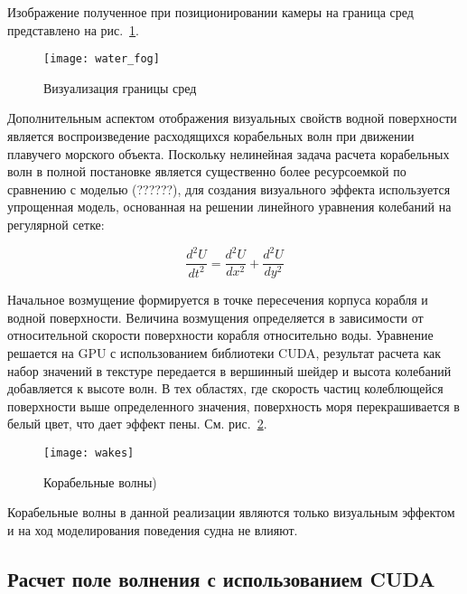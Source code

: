Изображение полученное при позиционировании камеры на граница сред представлено на рис.~\ref{water_fog}.

\begin{figure}[ht]
\begin{center}
\texttt{[image: water\_fog]}
\end{center}
\caption{Визуализация границы сред}
\label{water_fog}
\end{figure}



Дополнительным аспектом отображения визуальных свойств водной поверхности является воспроизведение расходящихся корабельных волн при движении плавучего морского объекта. Поскольку нелинейная задача расчета корабельных волн в полной постановке является существенно более ресурсоемкой по сравнению с моделью (??????), для создания визуального эффекта используется упрощенная модель, основанная на решении линейного уравнения колебаний на регулярной сетке:

\begin{equation}
	\frac{d^2U}{dt^2} = \frac{d^2U}{dx^2} +  \frac{d^2U}{dy^2}
\end{equation}

Начальное возмущение формируется в точке пересечения корпуса корабля и водной поверхности. Величина возмущения определяется в зависимости от относительной скорости поверхности корабля относительно воды. Уравнение решается на GPU с использованием библиотеки CUDA, результат расчета как набор значений в текстуре передается в вершинный шейдер и высота колебаний добавляется к высоте волн. В тех областях, где скорость частиц колеблющейся поверхности выше определенного значения, поверхность моря перекрашивается в белый цвет, что дает эффект пены. См. рис.~\ref{wakes}.

\begin{figure}[ht]
\begin{center}
\texttt{[image: wakes]}
\end{center}
\caption{Корабельные волны)}
\label{wakes}
\end{figure}

Корабельные волны в данной реализации являются только визуальным эффектом и на ход моделирования поведения судна не влияют.



\subsection{Расчет поле волнения с использованием CUDA}

